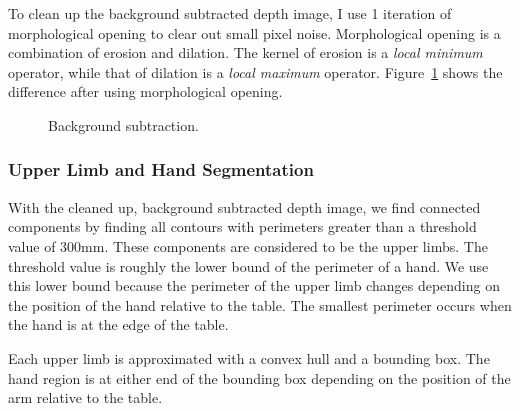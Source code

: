 To clean up the background subtracted depth image, I use 1 iteration of
morphological opening to clear out small pixel noise. Morphological opening is a
combination of erosion and dilation. The kernel of erosion is a \textit{local
minimum} operator, while that of dilation is a \textit{local maximum} operator. Figure~\ref{fig:background} shows the difference after using morphological
opening.

\begin{figure}[h]
  \centering
  \caption{Background subtraction.} \label{fig:background}
\end{figure}


\subsubsection{Upper Limb and Hand Segmentation}
With the cleaned up, background subtracted depth image, we find connected
components by finding all contours with perimeters greater than a
threshold value of 300mm. These components are considered to be the upper limbs. 
The threshold value is roughly the lower bound of the perimeter
of a hand. We use this lower bound because the perimeter of the
upper limb changes depending on the position of the hand relative to the table.
The smallest perimeter occurs when the hand is at the edge of the table.

Each upper limb is approximated with a convex hull and a bounding box. The
hand region is at either end of the bounding box depending on the position of 
the arm relative to the table.

